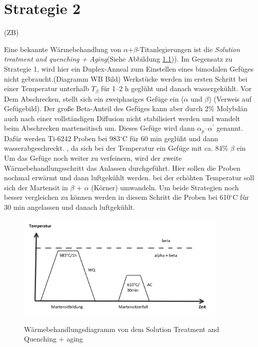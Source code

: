 \chapter{Strategie 2}

(ZB)

Eine bekannte Wärmebehandlung von $\alpha$+$\beta$-Titanlegierungen ist die  \textit{Solution treatment and quenching + Aging}(Siehe Abbildung \ref{fig:SQ})). Im Gegensatz zu  Strategie 1, wird hier ein Duplex-Anneal zum Einstellen eines bimodalen Gefüges nicht gebraucht.(Diagramm WB Bild)  Werkstücke werden im ersten Schritt bei einer Temperatur unterhalb $T_{\beta}$ für 1--2 h geglüht und danach wassergekühlt. Vor Dem Abschrecken, stellt sich ein zweiphasiges Gefüge ein ($\alpha$ und $\beta$) (Verweis auf Gefügebild). Der große Beta-Anteil des Gefüges kann aber durch 2\% Molybdän auch nach einer vollständigen Diffusion nicht stabilisiert werden und wandelt beim Abschrecken martensitisch um. Dieses Gefüge wird dann $\alpha_p$--$\alpha^\prime$ genannt.
Dafür werden Ti-6242 Proben bei 983$^\circ$C für 60 min geglüht und dann wasserabgeschreckt. , da sich bei der Temperatur ein Gefüge mit ca. 84\% $\beta$ ein
Um das Gefüge noch weiter zu verfeinern, wird der zweite Wärmebehandlungsschritt das Anlassen durchgeführt. Hier sollen die Proben nochmal erwärmt  und dann luftgekühlt werden. bei der erhöhten Temperatur soll sich der Martensit in $\beta$ + $\alpha$ (Körner) umwandeln.
Um beide Strategien noch besser vergleichen zu können werden in diesem Schritt  die Proben bei  610$^\circ$C  für 30 min angelassen und danach luftgekühlt.

\begin{figure}[H]
	\centering
	
	{\includegraphics[width=0.9\textwidth]{./Bilder/SQ.png}}
	\caption{Wärmebehandlungsdiagramm von dem Solution Treatment and Quenching + aging}
	\label{fig:SQ}
\end{figure}

